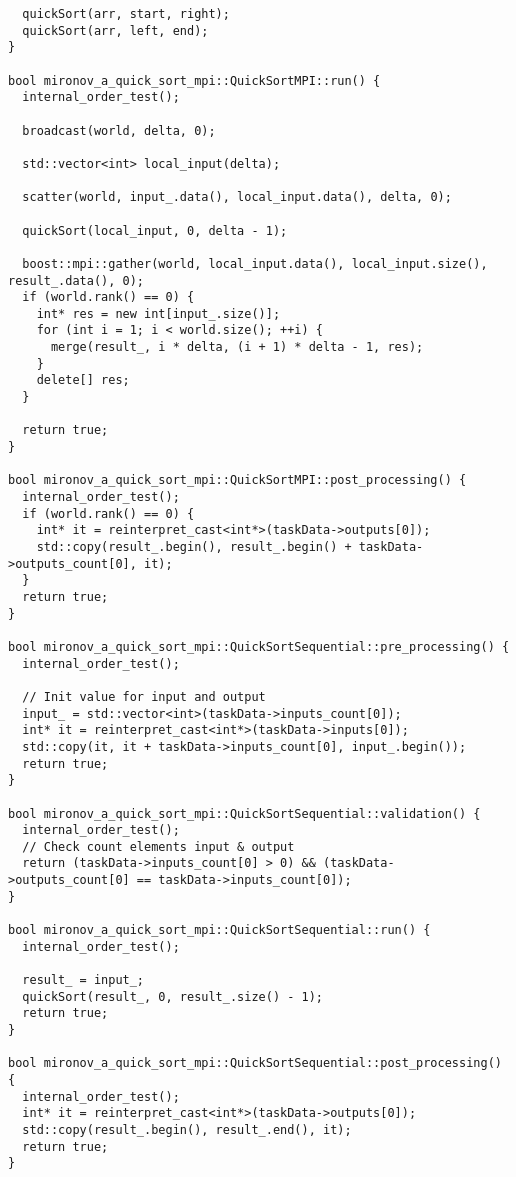 \documentclass[12pt]{article}
\begin{document}
\begin{lstlisting}
  quickSort(arr, start, right);
  quickSort(arr, left, end);
}

bool mironov_a_quick_sort_mpi::QuickSortMPI::run() {
  internal_order_test();

  broadcast(world, delta, 0);

  std::vector<int> local_input(delta);

  scatter(world, input_.data(), local_input.data(), delta, 0);

  quickSort(local_input, 0, delta - 1);

  boost::mpi::gather(world, local_input.data(), local_input.size(), result_.data(), 0);
  if (world.rank() == 0) {
    int* res = new int[input_.size()];
    for (int i = 1; i < world.size(); ++i) {
      merge(result_, i * delta, (i + 1) * delta - 1, res);
    }
    delete[] res;
  }

  return true;
}

bool mironov_a_quick_sort_mpi::QuickSortMPI::post_processing() {
  internal_order_test();
  if (world.rank() == 0) {
    int* it = reinterpret_cast<int*>(taskData->outputs[0]);
    std::copy(result_.begin(), result_.begin() + taskData->outputs_count[0], it);
  }
  return true;
}

bool mironov_a_quick_sort_mpi::QuickSortSequential::pre_processing() {
  internal_order_test();

  // Init value for input and output
  input_ = std::vector<int>(taskData->inputs_count[0]);
  int* it = reinterpret_cast<int*>(taskData->inputs[0]);
  std::copy(it, it + taskData->inputs_count[0], input_.begin());
  return true;
}

bool mironov_a_quick_sort_mpi::QuickSortSequential::validation() {
  internal_order_test();
  // Check count elements input & output
  return (taskData->inputs_count[0] > 0) && (taskData->outputs_count[0] == taskData->inputs_count[0]);
}

bool mironov_a_quick_sort_mpi::QuickSortSequential::run() {
  internal_order_test();

  result_ = input_;
  quickSort(result_, 0, result_.size() - 1);
  return true;
}

bool mironov_a_quick_sort_mpi::QuickSortSequential::post_processing() {
  internal_order_test();
  int* it = reinterpret_cast<int*>(taskData->outputs[0]);
  std::copy(result_.begin(), result_.end(), it);
  return true;
}


\end{lstlisting}
\end{document}
